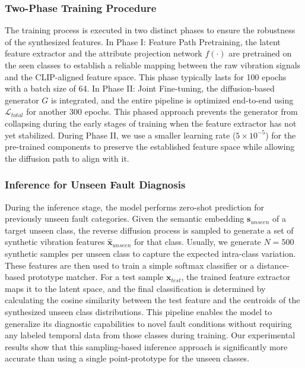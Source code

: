 \subsubsection{Two-Phase Training Procedure}
The training process is executed in two distinct phases to ensure the robustness of the synthesized features. In Phase I: Feature Path Pretraining, the latent feature extractor and the attribute projection network $f(\cdot)$ are pretrained on the seen classes to establish a reliable mapping between the raw vibration signals and the CLIP-aligned feature space. This phase typically lasts for 100 epochs with a batch size of 64. In Phase II: Joint Fine-tuning, the diffusion-based generator $G$ is integrated, and the entire pipeline is optimized end-to-end using $\mathcal{L}_{total}$ for another 300 epochs. This phased approach prevents the generator from collapsing during the early stages of training when the feature extractor has not yet stabilized. During Phase II, we use a smaller learning rate ($5 \times 10^{-5}$) for the pre-trained components to preserve the established feature space while allowing the diffusion path to align with it.

\subsubsection{Inference for Unseen Fault Diagnosis}
During the inference stage, the model performs zero-shot prediction for previously unseen fault categories. Given the semantic embedding $\mathbf{s}_{unseen}$ of a target unseen class, the reverse diffusion process is sampled to generate a set of synthetic vibration features $\hat{\mathbf{x}}_{unseen}$ for that class. Usually, we generate $N=500$ synthetic samples per unseen class to capture the expected intra-class variation. These features are then used to train a simple softmax classifier or a distance-based prototype matcher. For a test sample $\mathbf{x}_{test}$, the trained feature extractor maps it to the latent space, and the final classification is determined by calculating the cosine similarity between the test feature and the centroids of the synthesized unseen class distributions. This pipeline enables the model to generalize its diagnostic capabilities to novel fault conditions without requiring any labeled temporal data from those classes during training. Our experimental results show that this sampling-based inference approach is significantly more accurate than using a single point-prototype for the unseen classes.
